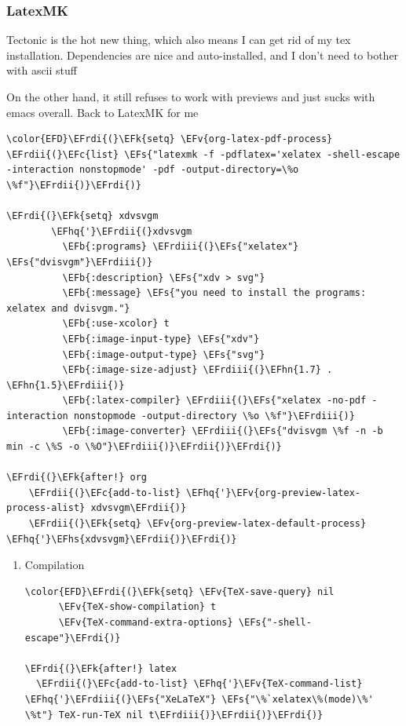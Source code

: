 \documentclass{scrartcl}
\newcommand{\EFk}[1]{\textcolor{EFk}{#1}} %
\newcommand{\EFs}[1]{\textcolor{EFs}{#1}} %
\newcommand{\EFb}[1]{\textcolor{EFb}{#1}} %
\newcommand{\EFc}[1]{\textcolor{EFc}{#1}} %
\newcommand{\EFv}[1]{\textcolor{EFv}{#1}} %
\newcommand{\EFhn}[1]{#1} %
\newcommand{\EFhq}[1]{#1} %
\newcommand{\EFhs}[1]{#1} %
\newcommand{\EFrdi}[1]{#1} %
\newcommand{\EFrdii}[1]{#1} %
\newcommand{\EFrdiii}[1]{#1} %
\begin{document}
\subsubsection{LatexMK}
\label{sec:org07c6cd8}
Tectonic is the hot new thing, which also means I can get rid of my tex
installation. Dependencies are nice and auto-installed, and I don't need to
bother with ascii stuff

On the other hand, it still refuses to work with previews and just sucks with
emacs overall. Back to LatexMK for me
\begin{Code}
\begin{Verbatim}[]
\color{EFD}\EFrdi{(}\EFk{setq} \EFv{org-latex-pdf-process} \EFrdii{(}\EFc{list} \EFs{"latexmk -f -pdflatex='xelatex -shell-escape -interaction nonstopmode' -pdf -output-directory=\%o \%f"}\EFrdii{)}\EFrdi{)}

\EFrdi{(}\EFk{setq} xdvsvgm
        \EFhq{'}\EFrdii{(}xdvsvgm
          \EFb{:programs} \EFrdiii{(}\EFs{"xelatex"} \EFs{"dvisvgm"}\EFrdiii{)}
          \EFb{:description} \EFs{"xdv > svg"}
          \EFb{:message} \EFs{"you need to install the programs: xelatex and dvisvgm."}
          \EFb{:use-xcolor} t
          \EFb{:image-input-type} \EFs{"xdv"}
          \EFb{:image-output-type} \EFs{"svg"}
          \EFb{:image-size-adjust} \EFrdiii{(}\EFhn{1.7} . \EFhn{1.5}\EFrdiii{)}
          \EFb{:latex-compiler} \EFrdiii{(}\EFs{"xelatex -no-pdf -interaction nonstopmode -output-directory \%o \%f"}\EFrdiii{)}
          \EFb{:image-converter} \EFrdiii{(}\EFs{"dvisvgm \%f -n -b min -c \%S -o \%O"}\EFrdiii{)}\EFrdii{)}\EFrdi{)}

\EFrdi{(}\EFk{after!} org
    \EFrdii{(}\EFc{add-to-list} \EFhq{'}\EFv{org-preview-latex-process-alist} xdvsvgm\EFrdii{)}
    \EFrdii{(}\EFk{setq} \EFv{org-preview-latex-default-process} \EFhq{'}\EFhs{xdvsvgm}\EFrdii{)}\EFrdi{)}
\end{Verbatim}
\end{Code}

\begin{enumerate}
\item Compilation
\label{sec:org740a21d}
\begin{Code}
\begin{Verbatim}[]
\color{EFD}\EFrdi{(}\EFk{setq} \EFv{TeX-save-query} nil
      \EFv{TeX-show-compilation} t
      \EFv{TeX-command-extra-options} \EFs{"-shell-escape"}\EFrdi{)}

\EFrdi{(}\EFk{after!} latex
  \EFrdii{(}\EFc{add-to-list} \EFhq{'}\EFv{TeX-command-list} \EFhq{'}\EFrdiii{(}\EFs{"XeLaTeX"} \EFs{"\%`xelatex\%(mode)\%' \%t"} TeX-run-TeX nil t\EFrdiii{)}\EFrdii{)}\EFrdi{)}
\end{Verbatim}
\end{Code}
\end{enumerate}
\end{document}
